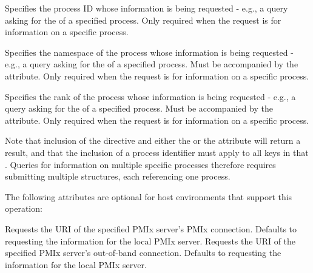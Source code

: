  Specifies the process ID whose information is being requested - e.g., a query asking for the  of a specified process. Only required when the request is for information on a specific process.
\pastePRIAttributeItemEnd

 Specifies the namespace of the process whose information is being requested - e.g., a query asking for the  of a specified process. Must be accompanied by the  attribute. Only required when the request is for information on a specific process.
\pastePRIAttributeItemEnd

 Specifies the rank of the process whose information is being requested - e.g., a query asking for the  of a specified process. Must be accompanied by the  attribute. Only required when the request is for information on a specific process.
\pastePRIAttributeItemEnd

Note that inclusion of the  directive and either the  or the  attribute will return a  result, and that the inclusion of a process identifier must apply to all keys in that . Queries for information on multiple specific processes therefore requires submitting multiple  structures, each referencing one process.

\optattrstart
The following attributes are optional for host environments that support this operation:

 Requests the URI of the specified \ac{PMIx} server's \ac{PMIx} connection. Defaults to requesting the information for the local \ac{PMIx} server.
\pastePRRTEAttributeItemEnd
{} Requests the URI of the specified \ac{PMIx} server's out-of-band connection. Defaults to requesting the information for the local \ac{PMIx} server.
\pastePRRTEAttributeItemEnd

